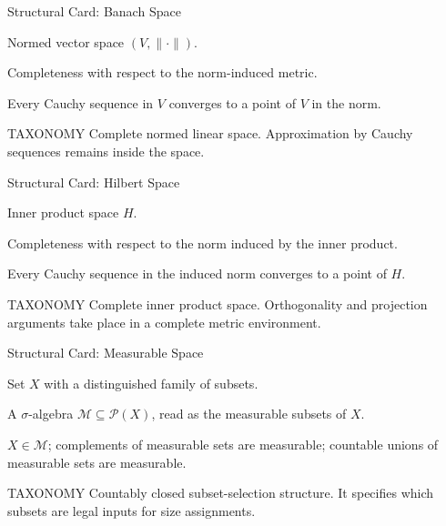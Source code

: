\begin{remark*}
\begin{structureblueprint}{Structural Card: Banach Space}
\begin{structureinherits}
Normed vector space \((V,\lVert\cdot\rVert)\).
\end{structureinherits}
\begin{structurenew}
Completeness with respect to the norm-induced metric.
\end{structurenew}
\begin{structuretheory}
Every Cauchy sequence in \(V\) converges to a point of \(V\) in the norm.
\end{structuretheory}
\begin{structuresection}{TAXONOMY}
Complete normed linear space.  Approximation by Cauchy sequences remains
inside the space.
\end{structuresection}
\end{structureblueprint}

\begin{structureblueprint}{Structural Card: Hilbert Space}
\begin{structureinherits}
Inner product space \(H\).
\end{structureinherits}
\begin{structurenew}
Completeness with respect to the norm induced by the inner product.
\end{structurenew}
\begin{structuretheory}
Every Cauchy sequence in the induced norm converges to a point of \(H\).
\end{structuretheory}
\begin{structuresection}{TAXONOMY}
Complete inner product space.  Orthogonality and projection arguments take
place in a complete metric environment.
\end{structuresection}
\end{structureblueprint}

\begin{structureblueprint}{Structural Card: Measurable Space}
\begin{structureinherits}
Set \(X\) with a distinguished family of subsets.
\end{structureinherits}
\begin{structurenew}
A \(\sigma\)-algebra \(\mathcal M\subseteq\mathcal P(X)\), read as the
measurable subsets of \(X\).
\end{structurenew}
\begin{structuretheory}
\(X\in\mathcal M\); complements of measurable sets are measurable; countable
unions of measurable sets are measurable.
\end{structuretheory}
\begin{structuresection}{TAXONOMY}
Countably closed subset-selection structure.  It specifies which subsets are
legal inputs for size assignments.
\end{structuresection}
\end{structureblueprint}


\end{remark*}
